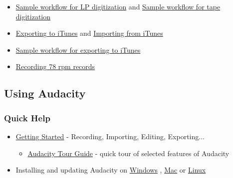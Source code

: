 \begin{multicols}{2}
\begin{itemize}
\item 
\hyperref[\foo{man:sample:workflow:for:lp:digitization:}]{Sample workflow for LP digitization}
 and 
\hyperref[\foo{man:sample:workflow:for:tape:digitization:}]{Sample workflow for tape digitization}

\end{itemize}

\begin{itemize}
\item 
\hyperref[\foo{man:tutorial:exporting:to:itunes:}]{Exporting to iTunes}
 and 
\hyperref[\foo{man:tutorial:how:to:import:files:from:itunes:}]{Importing from iTunes}

\item 
\hyperref[\foo{man:sample:workflow:for:exporting:to:itunes:}]{Sample workflow for exporting to iTunes}

\end{itemize}

\begin{itemize}
\item 
\hyperref[\foo{man:recording:78:rpm:records:}]{Recording 78 rpm records}

\end{itemize}

\label{index:bottom:using}
\subsection{Using Audacity}
\label{index:using}
\subsubsection{Quick Help}
\begin{itemize}
\item 
\hyperref[\foo{quick:help:}]{Getting Started}
 - Recording, Importing, Editing, Exporting...

\begin{itemize}
\item 
\hyperref[\foo{man:audacity:tour:guide:}]{Audacity Tour Guide}
 - quick tour of selected features of Audacity
\end{itemize}

\item Installing and updating Audacity on 
\hyperref[\foo{man:installing:and:updating:audacity:on:windows:}]{Windows}
, 
\hyperref[\foo{man:installing:and:updating:audacity:on:mac:os:x:}]{Mac}
 or 
\hyperref[\foo{man:installing:and:updating:audacity:on:linux:}]{Linux}


\end{itemize}
\end{multicols}
